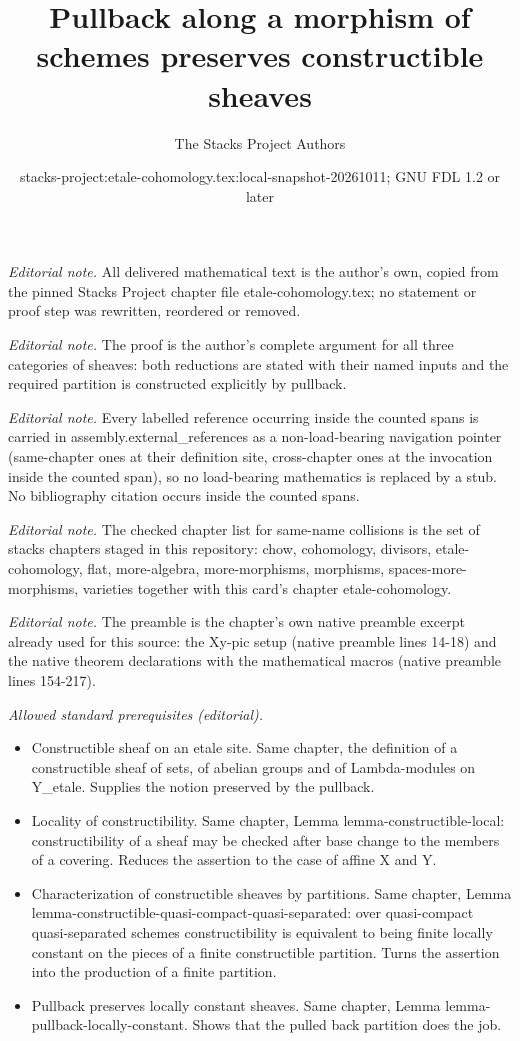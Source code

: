 \documentclass[10pt,a4paper]{amsart}
\title{Pullback along a morphism of schemes preserves constructible sheaves}
\author{The Stacks Project Authors}
\date{stacks-project:etale-cohomology.tex:local-snapshot-20261011; GNU FDL 1.2 or later}
\theoremstyle{plain}
\theoremstyle{definition}
\theoremstyle{remark}
\numberwithin{equation}{subsection}
\begin{document}
\maketitle
\noindent\textit{Editorial note.} All delivered mathematical text is the author's own, copied from the pinned Stacks Project chapter file etale-cohomology.tex; no statement or proof step was rewritten, reordered or removed.\par\medskip
\noindent\textit{Editorial note.} The proof is the author's complete argument for all three categories of sheaves: both reductions are stated with their named inputs and the required partition is constructed explicitly by pullback.\par\medskip
\noindent\textit{Editorial note.} Every labelled reference occurring inside the counted spans is carried in assembly.external\_references as a non-load-bearing navigation pointer (same-chapter ones at their definition site, cross-chapter ones at the invocation inside the counted span), so no load-bearing mathematics is replaced by a stub. No bibliography citation occurs inside the counted spans.\par\medskip
\noindent\textit{Editorial note.} The checked chapter list for same-name collisions is the set of stacks chapters staged in this repository: chow, cohomology, divisors, etale-cohomology, flat, more-algebra, more-morphisms, morphisms, spaces-more-morphisms, varieties together with this card's chapter etale-cohomology.\par\medskip
\noindent\textit{Editorial note.} The preamble is the chapter's own native preamble excerpt already used for this source: the Xy-pic setup (native preamble lines 14-18) and the native theorem declarations with the mathematical macros (native preamble lines 154-217).\par\medskip
\noindent\textit{Allowed standard prerequisites (editorial).}\begin{itemize}
\item Constructible sheaf on an etale site. Same chapter, the definition of a constructible sheaf of sets, of abelian groups and of Lambda-modules on Y\_etale. Supplies the notion preserved by the pullback.
\item Locality of constructibility. Same chapter, Lemma lemma-constructible-local: constructibility of a sheaf may be checked after base change to the members of a covering. Reduces the assertion to the case of affine X and Y.
\item Characterization of constructible sheaves by partitions. Same chapter, Lemma lemma-constructible-quasi-compact-quasi-separated: over quasi-compact quasi-separated schemes constructibility is equivalent to being finite locally constant on the pieces of a finite constructible partition. Turns the assertion into the production of a finite partition.
\item Pullback preserves locally constant sheaves. Same chapter, Lemma lemma-pullback-locally-constant. Shows that the pulled back partition does the job.
\end{itemize}\medskip
\end{document}
